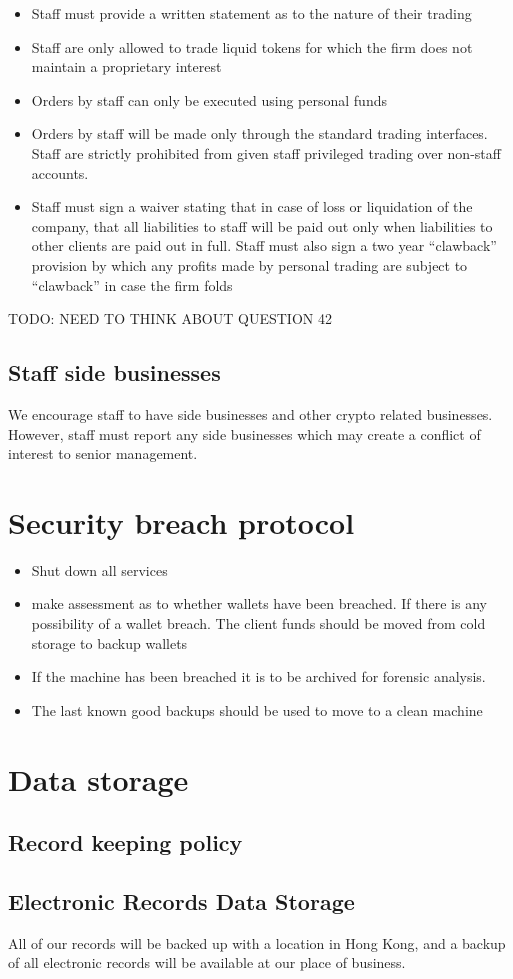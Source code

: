 \begin{itemize}
 \item Staff must provide a written statement as to the nature of
   their trading
  \item Staff are only allowed to trade liquid tokens for which the
    firm does not maintain a proprietary interest
  \item Orders by staff can only be executed using personal funds
  \item Orders by staff will be made only through the standard trading
    interfaces.  Staff are strictly prohibited from given staff
    privileged trading over non-staff accounts.
  \item Staff must sign a waiver stating that in case of loss or
    liquidation of the company, that all liabilities to staff will be
    paid out only when liabilities to other clients are paid out in
    full.  Staff must also sign a two year ``clawback'' provision by
    which any profits made by personal trading are subject to
    ``clawback'' in case the firm folds
\end{itemize}

TODO: NEED TO THINK ABOUT QUESTION 42

\subsection{Staff side businesses}
We encourage staff to have side businesses and other crypto related
businesses.  However, staff must report any side businesses which may
create a conflict of interest to senior management.

\section{Security breach protocol}

\begin{itemize}
\item Shut down all services
  \item make assessment as to whether wallets have been breached.  If
    there is any possibility of a wallet breach.  The client funds should be
    moved from cold storage to backup wallets
\item If the machine has been breached it is to be archived for
  forensic analysis.
\item The last known good backups should be used to
  move to a clean machine
  
\end{itemize}    

\section{Data storage}
\subsection{Record keeping policy}


\subsection{Electronic Records Data Storage}
All of our records will be backed up with a location in Hong Kong, and
a backup of all electronic records will be available at our place of business.
